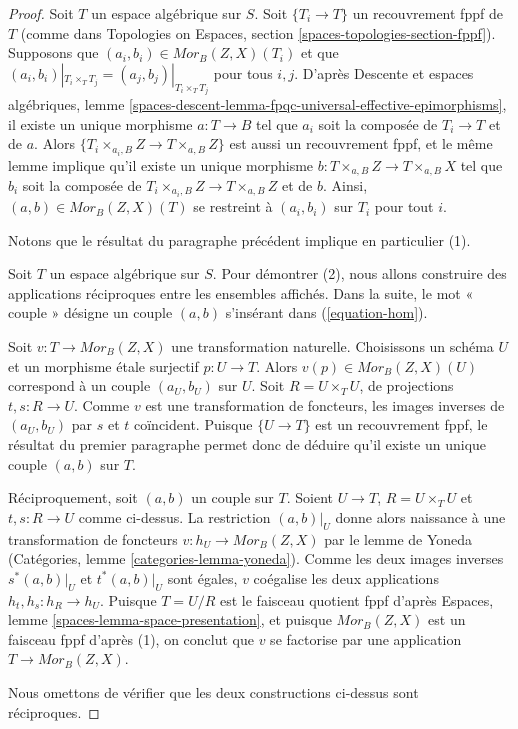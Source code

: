 \begin{proof}
Soit $T$ un espace algébrique sur $S$. Soit $\{T_i \to T\}$ un
recouvrement fppf de $T$ (comme dans
Topologies on Espaces, section \ref{spaces-topologies-section-fppf}).
Supposons que $(a_i, b_i) \in \mathit{Mor}_B(Z, X)(T_i)$ et
que $(a_i, b_i)|_{T_i \times_T T_j} = (a_j, b_j)|_{T_i \times_T T_j}$
pour tous $i, j$. D'après
Descente et espaces algébriques,
lemme \ref{spaces-descent-lemma-fpqc-universal-effective-epimorphisms},
il existe un unique morphisme $a : T \to B$ tel que $a_i$ soit la
composée de $T_i \to T$ et de $a$. Alors
$\{T_i \times_{a_i, B} Z \to T \times_{a, B} Z\}$ est aussi un recouvrement
fppf, et le même lemme implique qu'il existe un unique morphisme
$b : T \times_{a, B} Z \to T \times_{a, B} X$ tel que $b_i$ soit la
composée de $T_i \times_{a_i, B} Z \to T \times_{a, B} Z$ et de $b$. Ainsi,
$(a, b) \in \mathit{Mor}_B(Z, X)(T)$ se restreint à $(a_i, b_i)$
sur $T_i$ pour tout $i$.

\medskip\noindent
Notons que le résultat du paragraphe précédent implique en particulier (1).

\medskip\noindent
Soit $T$ un espace algébrique sur $S$. Pour démontrer (2), nous allons
construire des applications réciproques entre les ensembles affichés. Dans la
suite, le mot « couple » désigne un couple $(a, b)$ s'insérant
dans (\ref{equation-hom}).

\medskip\noindent
Soit $v : T \to \mathit{Mor}_B(Z, X)$ une transformation naturelle.
Choisissons un schéma $U$ et un morphisme étale surjectif $p : U \to T$.
Alors $v(p) \in \mathit{Mor}_B(Z, X)(U)$ correspond à un couple $(a_U, b_U)$
sur $U$. Soit $R = U \times_T U$, de projections $t, s : R \to U$.
Comme $v$ est une transformation de foncteurs, les images inverses de
$(a_U, b_U)$ par $s$ et $t$ coïncident. Puisque $\{U \to T\}$ est un
recouvrement fppf, le résultat du premier paragraphe permet donc de
déduire qu'il existe un unique couple $(a, b)$ sur $T$.

\medskip\noindent
Réciproquement, soit $(a, b)$ un couple sur $T$.
Soient $U \to T$, $R = U \times_T U$ et $t, s : R \to U$ comme
ci-dessus. La restriction $(a, b)|_U$ donne alors naissance à une
transformation de foncteurs $v : h_U \to \mathit{Mor}_B(Z, X)$ par le
lemme de Yoneda
(Catégories, lemme \ref{categories-lemma-yoneda}).
Comme les deux images inverses $s^*(a, b)|_U$ et $t^*(a, b)|_U$
sont égales, $v$ coégalise les deux applications
$h_t, h_s : h_R \to h_U$. Puisque $T = U/R$ est le faisceau quotient fppf d'après
Espaces, lemme \ref{spaces-lemma-space-presentation},
et puisque $\mathit{Mor}_B(Z, X)$ est un faisceau fppf d'après (1), on conclut
que $v$ se factorise par une application $T \to \mathit{Mor}_B(Z, X)$.

\medskip\noindent
Nous omettons de vérifier que les deux constructions ci-dessus sont
réciproques.
\end{proof}

